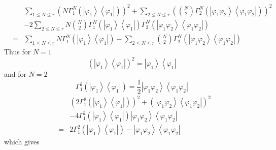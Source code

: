 \documentclass[12pt]{article}
\begin{document}
\begin{eqnarray*}
&&\sum_{1\leq N\leq r}\left( N\Gamma _{1}^{N}\left( \left\vert \varphi
_{1}\right\rangle \left\langle \varphi _{1}\right\vert \right) \right)
^{2}+\sum_{2\leq N\leq r}\left( \binom{N}{2}\Gamma _{2}^{N}\left( \left\vert
\varphi _{1}\varphi _{2}\right\rangle \left\langle \varphi _{1}\varphi
_{2}\right\vert \right) \right) ^{2} \\
&&-2\sum_{2\leq N\leq r}N\binom{N}{2}\Gamma _{1}^{N}\left( \left\vert
\varphi _{1}\right\rangle \left\langle \varphi _{1}\right\vert \right)
\Gamma _{2}^{N}\left( \left\vert \varphi _{1}\varphi _{2}\right\rangle
\left\langle \varphi _{1}\varphi _{2}\right\vert \right) \\
&=&\sum_{1\leq N\leq r}N\Gamma _{1}^{N}\left( \left\vert \varphi
_{1}\right\rangle \left\langle \varphi _{1}\right\vert \right) -\sum_{2\leq
N\leq r}\binom{N}{2}\Gamma _{2}^{N}\left( \left\vert \varphi _{1}\varphi
_{2}\right\rangle \left\langle \varphi _{1}\varphi _{2}\right\vert \right)
\end{eqnarray*}%
Thus for $N=1$ 
\begin{equation*}
\left( \left\vert \varphi _{1}\right\rangle \left\langle \varphi
_{1}\right\vert \right) ^{2}=\left\vert \varphi _{1}\right\rangle
\left\langle \varphi _{1}\right\vert
\end{equation*}%
and for $N=2$%
\begin{equation*}
\Gamma _{1}^{2}\left( \left\vert \varphi _{1}\right\rangle \left\langle
\varphi _{1}\right\vert \right) =\frac{1}{2}\left\vert \varphi _{1}\varphi
_{2}\right\rangle \left\langle \varphi _{1}\varphi _{2}\right\vert
\end{equation*}%
\begin{eqnarray*}
&&\left( 2\Gamma _{1}^{2}\left( \left\vert \varphi _{1}\right\rangle
\left\langle \varphi _{1}\right\vert \right) \right) ^{2}+\left( \left\vert
\varphi _{1}\varphi _{2}\right\rangle \left\langle \varphi _{1}\varphi
_{2}\right\vert \right) ^{2} \\
&&-4\Gamma _{1}^{2}\left( \left\vert \varphi _{1}\right\rangle \left\langle
\varphi _{1}\right\vert \right) \left\vert \varphi _{1}\varphi
_{2}\right\rangle \left\langle \varphi _{1}\varphi _{2}\right\vert \\
&=&2\Gamma _{1}^{2}\left( \left\vert \varphi _{1}\right\rangle \left\langle
\varphi _{1}\right\vert \right) -\left\vert \varphi _{1}\varphi
_{2}\right\rangle \left\langle \varphi _{1}\varphi _{2}\right\vert
\end{eqnarray*}%
which gives%
\end{document}
